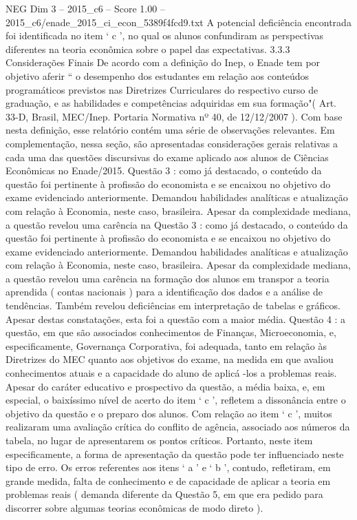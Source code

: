 \begin{textsample}{NEG Dim 3 – 2015\_c6 – Score 1.00 – 2015\_c6/enade\_2015\_ci\_econ\_5389f4fcd9.txt}
A potencial deficiência encontrada foi identificada no item ‘ c ’, no qual os alunos confundiram as perspectivas diferentes na teoria econômica sobre o papel das expectativas. 3.3.3 Considerações Finais De acordo com a definição do Inep, o Enade tem por objetivo aferir “ o desempenho dos estudantes em relação aos conteúdos programáticos previstos nas Diretrizes Curriculares do respectivo curso de graduação, e as habilidades e competências adquiridas em sua formação"( Art. 33-D, Brasil, MEC/Inep.
Portaria Normativa nº 40, de 12/12/2007 ).
Com base nesta definição, esse relatório contém uma série de observações relevantes.
Em complementação, nessa seção, são apresentadas considerações gerais relativas a cada uma das questões discursivas do exame aplicado aos alunos de Ciências Econômicas no Enade/2015.
Questão 3 : como já destacado, o conteúdo da questão foi pertinente à profissão do economista e se encaixou no objetivo do exame evidenciado anteriormente.
Demandou habilidades analíticas e atualização com relação à Economia, neste caso, brasileira.
Apesar da complexidade mediana, a questão revelou uma carência na Questão 3 : como já destacado, o conteúdo da questão foi pertinente à profissão do economista e se encaixou no objetivo do exame evidenciado anteriormente.
Demandou habilidades analíticas e atualização com relação à Economia, neste caso, brasileira.
Apesar da complexidade mediana, a questão revelou uma carência na formação dos alunos em transpor a teoria aprendida ( contas nacionais ) para a identificação dos dados e a análise de tendências.
Também revelou deficiências em interpretação de tabelas e gráficos.
Apesar destas constatações, esta foi a questão com a maior média.
Questão 4 : a questão, em que são associados conhecimentos de Finanças, Microeconomia, e, especificamente, Governança Corporativa, foi adequada, tanto em relação às Diretrizes do MEC quanto aos objetivos do exame, na medida em que avaliou conhecimentos atuais e a capacidade do aluno de aplicá -los a problemas reais.
Apesar do caráter educativo e prospectivo da questão, a média baixa, e, em especial, o baixíssimo nível de acerto do item ‘ c ’, refletem a dissonância entre o objetivo da questão e o preparo dos alunos.
Com relação ao item ‘ c ’, muitos realizaram uma avaliação crítica do conflito de agência, associado aos números da tabela, no lugar de apresentarem os pontos críticos.
Portanto, neste item especificamente, a forma de apresentação da questão pode ter influenciado neste tipo de erro.
Os erros referentes aos itens ‘ a ’ e ‘ b ’, contudo, refletiram, em grande medida, falta de conhecimento e de capacidade de aplicar a teoria em problemas reais ( demanda diferente da Questão 5, em que era pedido para discorrer sobre algumas teorias econômicas de modo direto ).

\end{textsample}
